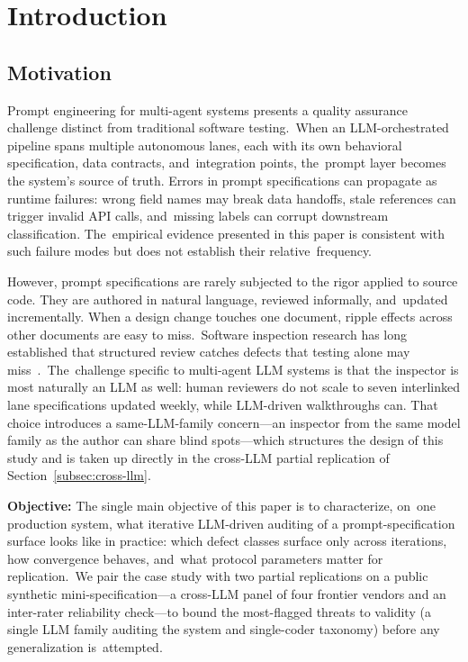 \documentclass[software,article,accept,pdftex,oneauthor]{Definitions/mdpi}
\def\hl#1{#1}
\begin{document}
\section{Introduction}
\label{sec:introduction}
\unskip

\subsection{Motivation}

Prompt engineering for multi-agent systems presents a quality assurance challenge distinct from traditional software testing.~When an LLM-orchestrated pipeline spans multiple autonomous lanes, each with its own behavioral specification, data contracts, and~integration points, the~prompt layer becomes the system's source of truth. Errors in prompt specifications can propagate as runtime failures: wrong field names may break data handoffs, stale references can trigger invalid API calls, and~missing labels can corrupt downstream classification. The~empirical evidence presented in this paper is consistent with such failure modes but does not establish their relative~frequency.

However, prompt specifications are rarely subjected to the rigor applied to source code. They are authored in natural language, reviewed informally, and~updated incrementally. When a design change touches one document, ripple effects across other documents are easy to miss.~Software inspection research has long established that structured review catches defects that testing alone may miss~\cite{fagan1976design,boehm2001defect,weinberg1984reviews}.~The~challenge specific to multi-agent LLM systems is that the inspector is most naturally an LLM as well: human reviewers do not scale to seven interlinked lane specifications updated weekly, while LLM-driven walkthroughs can. That choice introduces a same-LLM-family concern---an inspector from the same model family as the author can share blind spots---which structures the design of this study and is taken up directly in the cross-LLM partial replication of Section~\ref{subsec:cross-llm}.

\textbf{\hl{Objective:}%
} The single main objective of this paper is to characterize, on~one production system, what iterative LLM-driven auditing of a prompt-specification surface looks like in practice: which defect classes surface only across iterations, how convergence behaves, and~what protocol parameters matter for replication.~We pair the case study with two partial replications on a public synthetic mini-specification---a cross-LLM panel of four frontier vendors and an inter-rater reliability check---to bound the most-flagged threats to validity (a single LLM family auditing the system and single-coder taxonomy) before any generalization is~attempted.
\end{document}
